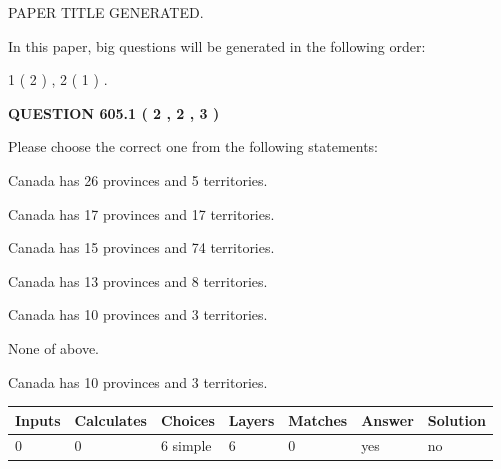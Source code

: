 \documentclass[12pt]{article}
\begin{document}
   
\vspace{0.2in}
   
   
   
   
   
   
   
   
 \vspace{0.2in}
 
 
 
 
   
   
 PAPER TITLE GENERATED.
   
   
   
\vspace{0.2in}
   
In this paper, big questions will be generated in the following order: 
   
   
   1 ( 2 )
 ,
   2 ( 1 )
 .
  
\vspace{0.2in}
  
{\textbf{\Large{QUESTION
605.1 
 ( 2 , 2 , 3 )
}}}
  
  
Please choose the correct one from the following statements:
 
 
Canada has  26 provinces and  5 territories.
 
 
Canada has  17 provinces and  17 territories.
 
 
Canada has  15 provinces and  74 territories.
 
 
Canada has  13 provinces and  8 territories.
 
 
Canada has 10  provinces and 3 territories.
 
 
 None of above.
 
 
\noindent{}
 
 
Canada has 10  provinces and 3 territories.
 
 
\noindent{}
 
 
   
   
   
   
\noindent\begin{tabular}{|l|l|l|l|l|l|l|}
 \hline
Inputs & Calculates & Choices & Layers & Matches & Answer & Solution \\ \hline
 0  & 
 0  & 
 6
  simple  
  & 
 6  & 
 0  & 
  yes & 
  no 
  \\ \hline
 \end{tabular}
   
\end{document}
